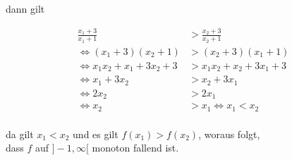 \documentclass[a4paper, 11pt]{article}
\begin{document}
dann gilt

\begin{align*}
    \frac{x_1 + 3}{x_1 + 1} &> \frac{x_2 + 3}{x_2 + 1} \\
    \Leftrightarrow (x_1 + 3)(x_2 + 1) &> (x_2 + 3)(x_1 + 1) \\
    \Leftrightarrow x_1 x_2 + x_1 + 3 x_2 + 3 &> x_1 x_2 + x_2 + 3 x_1 + 3 \\
    \Leftrightarrow x_1 + 3 x_2 &> x_2 + 3 x_1 \\
    \Leftrightarrow 2 x_2 &> 2 x_1 \\
    \Leftrightarrow x_2 &> x_1 \Leftrightarrow x_1 < x_2 \\
\end{align*}

da gilt \(x_1 < x_2\) und es gilt \(f(x_1) > f(x_2)\), woraus folgt, \\
dass \(f\) auf \(]-1, \infty[\) monoton fallend ist.
\end{document}
